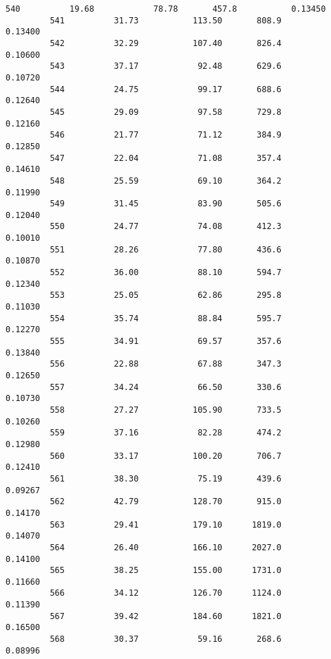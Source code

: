 \documentclass[11pt]{article}
\begin{document}
\begin{Verbatim}[commandchars=\\\{\}]
         540          19.68            78.78       457.8           0.13450   
         541          31.73           113.50       808.9           0.13400   
         542          32.29           107.40       826.4           0.10600   
         543          37.17            92.48       629.6           0.10720   
         544          24.75            99.17       688.6           0.12640   
         545          29.09            97.58       729.8           0.12160   
         546          21.77            71.12       384.9           0.12850   
         547          22.04            71.08       357.4           0.14610   
         548          25.59            69.10       364.2           0.11990   
         549          31.45            83.90       505.6           0.12040   
         550          24.77            74.08       412.3           0.10010   
         551          28.26            77.80       436.6           0.10870   
         552          36.00            88.10       594.7           0.12340   
         553          25.05            62.86       295.8           0.11030   
         554          35.74            88.84       595.7           0.12270   
         555          34.91            69.57       357.6           0.13840   
         556          22.88            67.88       347.3           0.12650   
         557          34.24            66.50       330.6           0.10730   
         558          27.27           105.90       733.5           0.10260   
         559          37.16            82.28       474.2           0.12980   
         560          33.17           100.20       706.7           0.12410   
         561          38.30            75.19       439.6           0.09267   
         562          42.79           128.70       915.0           0.14170   
         563          29.41           179.10      1819.0           0.14070   
         564          26.40           166.10      2027.0           0.14100   
         565          38.25           155.00      1731.0           0.11660   
         566          34.12           126.70      1124.0           0.11390   
         567          39.42           184.60      1821.0           0.16500   
         568          30.37            59.16       268.6           0.08996   
         

\end{Verbatim}
\end{document}
